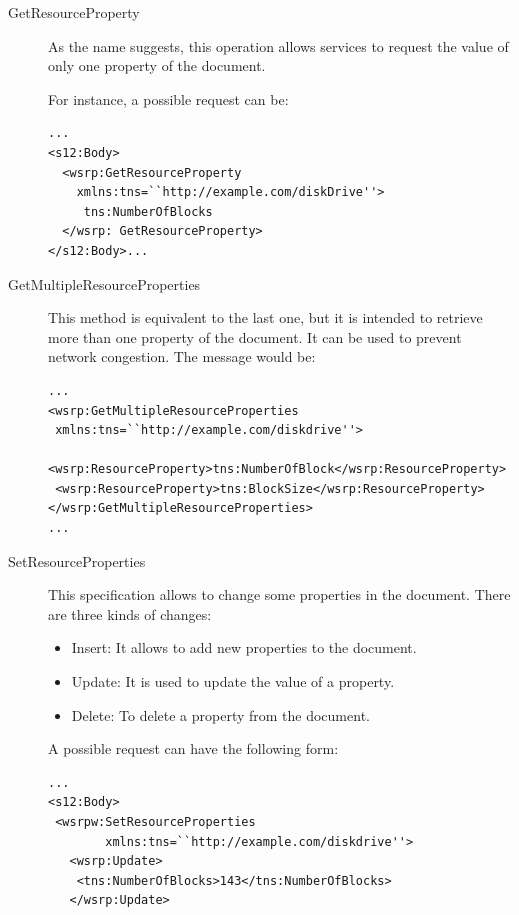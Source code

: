 \begin{description}
\item[GetResourceProperty]
As the name suggests, this operation allows services to request 
the value of only one property of the document.

For instance, a possible request can be:


\lstset{language=XML, numbersep=5pt,basicstyle=\small, frame=single}
\begin{lstlisting}
...
<s12:Body>
  <wsrp:GetResourceProperty 
    xmlns:tns=``http://example.com/diskDrive''>
     tns:NumberOfBlocks
  </wsrp: GetResourceProperty>
</s12:Body>...
\end{lstlisting}

\item[GetMultipleResourceProperties]
This method is equivalent to the last one, but it is intended to retrieve
more than one property of the document. 
It can be used to prevent network congestion. The message would be:
\newpage
\lstset{language=XML, numbersep=5pt,basicstyle=\footnotesize ,frame=single}
\begin{lstlisting}
...
<wsrp:GetMultipleResourceProperties
 xmlns:tns=``http://example.com/diskdrive''>
 <wsrp:ResourceProperty>tns:NumberOfBlock</wsrp:ResourceProperty>
 <wsrp:ResourceProperty>tns:BlockSize</wsrp:ResourceProperty>
</wsrp:GetMultipleResourceProperties>
...
\end{lstlisting}

\item[SetResourceProperties]
This specification allows to change some properties in the document. There are three kinds of changes:

\begin{itemize}
\item Insert: It allows to add new properties to the document.
\item Update: It is used to update the value of a property.
\item Delete: To delete a property from the document.
\end{itemize}

A possible request can have the following form:

\lstset{language=XML, numbersep=5pt, basicstyle=\small,frame=single}
\begin{lstlisting}
...
<s12:Body>
 <wsrpw:SetResourceProperties
        xmlns:tns=``http://example.com/diskdrive''>
   <wsrp:Update>
    <tns:NumberOfBlocks>143</tns:NumberOfBlocks>
   </wsrp:Update>


\end{lstlisting}
\end{description}
